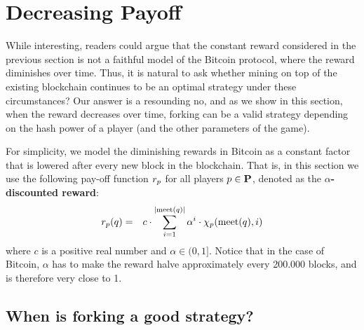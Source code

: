 
\section{Decreasing Payoff}
\label{sec-dec}


While interesting, readers could argue that the constant reward considered in the previous section is not a faithful model of the Bitcoin protocol, where the reward diminishes over time. Thus, it is natural to ask whether  mining on top of the existing blockchain continues to be an  optimal strategy under these 
circumstances? Our answer is a resounding no, and as we show in this section, when the reward decreases over time, forking can be a valid strategy depending on the hash power of a player (and the other parameters of the game). 

For simplicity, we model the diminishing rewards in Bitcoin as a constant factor that is lowered after every new block in the blockchain. That is, in this section 
we use the following pay-off function $r_p$ for all players $p \in \mathbf{P}$, denoted as the \textbf{$\alpha$-discounted reward}: 
\begin{eqnarray*}
r_p(q) & = & 
{\displaystyle c \cdot \sum_{i=1}^{|\text{\rm meet}(q)|} \alpha^i \cdot \chi_p(\text{\rm meet}(q),i)} \end{eqnarray*}
where $c$ is a positive real number and $\alpha \in (0,1]$. Notice that in the case of Bitcoin, $\alpha$ has to make the reward halve approximately every 200.000 blocks, and is therefore very close to 1.

%

\subsection{When is forking a good strategy?}
\label{sec-forkingstrategies}

